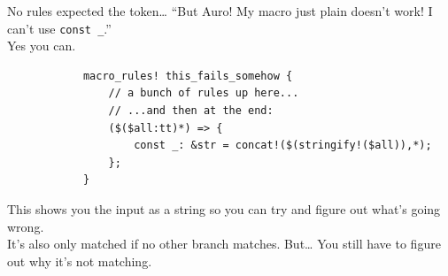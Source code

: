 \documentclass{beamer}
\begin{document}
	\begin{frame}[fragile]{No rules expected the token\dots}
		``But Auro! My macro just plain doesn't work! I can't use \texttt{const _}.'' \\

		Yes you can.

		\begin{verbatim}
			macro_rules! this_fails_somehow {
				// a bunch of rules up here...
				// ...and then at the end:
				($($all:tt)*) => {
					const _: &str = concat!($(stringify!($all)),*);
				};
			}
		\end{verbatim}

		This shows you the input as a string so you can try and figure out what's going wrong. \\

		It's also only matched if no other branch matches. But\dots
		\pause
		You still have to figure out why it's not matching.
	\end{frame}
\end{document}
